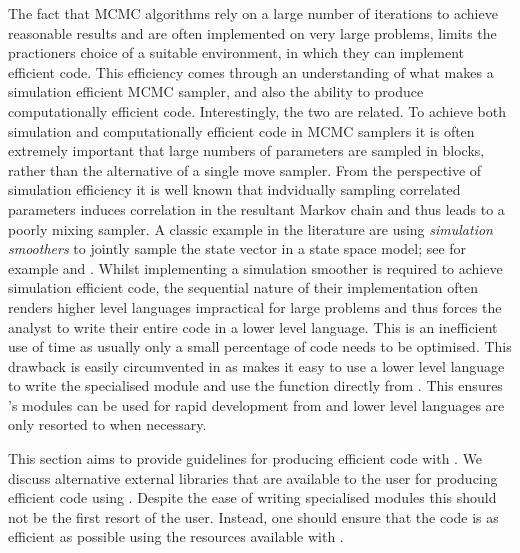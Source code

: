 \documentclass[article]{jss}
\begin{document}
The fact that MCMC algorithms rely on a large number of iterations to
achieve reasonable results and are often implemented on very large
problems, limits the practioners choice of a suitable environment, in which they can 
implement efficient code. This efficiency comes through
an understanding of what makes a simulation efficient MCMC sampler,
and also the ability to produce computationally efficient code.
Interestingly, the two are related. To achieve both simulation and computationally
efficient code in MCMC samplers it is often extremely important that large
numbers of parameters are sampled in blocks, rather than the alternative of a
single move sampler. From the perspective of simulation efficiency it is well known
that indvidually sampling correlated parameters induces correlation in the resultant
Markov chain and thus leads to a poorly mixing sampler. A classic example in the
literature are using \emph{simulation smoothers }to jointly sample the
state vector in a state space model; see for
example \citet{CarterKohn1994} and \citet{deJongShepard1995}.  Whilst
implementing a simulation smoother is required to achieve simulation
efficient code, the sequential nature of their implementation often
renders higher level languages impractical for large problems and thus
forces the analyst to write their entire code in a lower level
language. This is an inefficient use of time as usually only a small
percentage of code needs to be optimised. This drawback is easily
circumvented in  as  makes it easy to use
a lower level language to write the specialised module and use the
function directly from . This ensures 's
modules can be used for rapid development from  and
lower level languages are only resorted to when necessary.

This section aims to provide guidelines for producing efficient code with
. We discuss alternative external libraries that are
available to the user for producing efficient code using .
Despite the ease of writing specialised modules this should not be the
first resort of the user. Instead, one should ensure that the
 code is as efficient as possible using the resources
available with .
\end{document}

